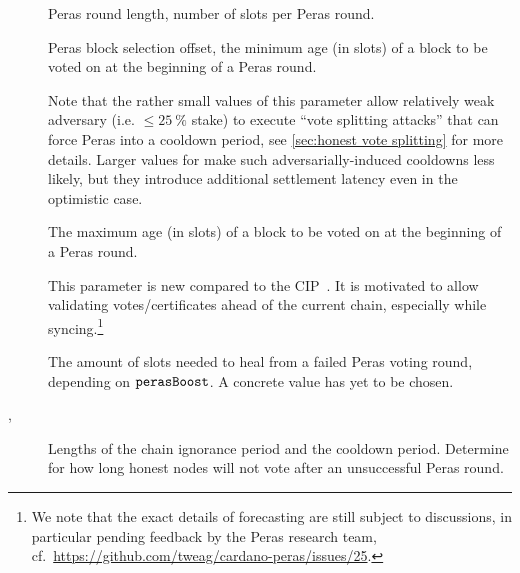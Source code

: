 \begin{description}
\item[\perasRoundSlots]
  Peras round length, number of slots per Peras round.
\item[\perasBlockMinSlots]
  Peras block selection offset, the minimum age (in slots) of a block to be voted on at the beginning of a Peras round.

  Note that the rather small values of this parameter allow relatively weak adversary (i.e. $\le \qty{25}{\percent}$ stake) to execute \enquote{vote splitting attacks} that can force Peras into a cooldown period, see \cref{sec:honest vote splitting} for more details.
  Larger values for \perasBlockMinSlots{} make such adversarially-induced cooldowns less likely, but they introduce additional settlement latency even in the optimistic case.
\item[\perasBlockMaxSlots]
  The maximum age (in slots) of a block to be voted on at the beginning of a Peras round.

  This parameter is new compared to the CIP~\cite{peras-cip}.
  It is motivated to allow validating votes/certificates ahead of the current chain, especially while syncing.\footnote{
  We note that the exact details of forecasting are still subject to discussions, in particular pending feedback by the Peras research team, cf.~\url{https://github.com/tweag/cardano-peras/issues/25}.}
\item[\perasHealingSlots]
  The amount of slots needed to heal from a failed Peras voting round, depending on $\mathtt{perasBoost}$.
  A concrete value has yet to be chosen.
\item[\perasIgnoranceRounds, \perasCooldownRounds]
  Lengths of the chain ignorance period and the cooldown period.
  Determine for how long honest nodes will not vote after an unsuccessful Peras round.


\end{description}
